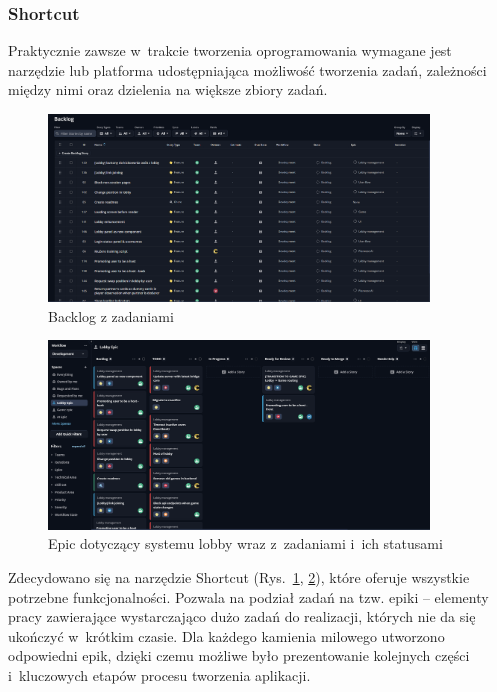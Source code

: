 \subsubsection{Shortcut}

Praktycznie zawsze w~trakcie tworzenia oprogramowania wymagane jest
narzędzie lub platforma udostępniająca możliwość tworzenia zadań,
zależności między nimi oraz dzielenia na większe zbiory zadań.

\begin{figure}[h!]
    \centering
    \includegraphics[width=0.9\textwidth]{img/shortcut/shortcut_backlog.png}
    \caption{Backlog z zadaniami}
    \label{fig:xd_shortcut_backlog}
\end{figure}

\begin{figure}[h!]
    \centering
    \includegraphics[width=0.9\textwidth]{img/shortcut/shortcut_epic.png}
    \caption{Epic dotyczący systemu lobby wraz z~zadaniami i~ich statusami}
    \label{fig:xd_shortcut_epic}
\end{figure}

Zdecydowano się na narzędzie Shortcut
\cite{Shortcut} (Rys.~\ref{fig:xd_shortcut_backlog}, \ref{fig:xd_shortcut_epic}),
które oferuje
wszystkie potrzebne funkcjonalności. Pozwala na podział zadań na tzw.
epiki -- elementy pracy zawierające wystarczająco dużo zadań do realizacji,
których nie da się ukończyć w~krótkim czasie. Dla każdego kamienia milowego
utworzono odpowiedni epik, dzięki czemu możliwe było prezentowanie
kolejnych części i~kluczowych etapów procesu tworzenia aplikacji.

